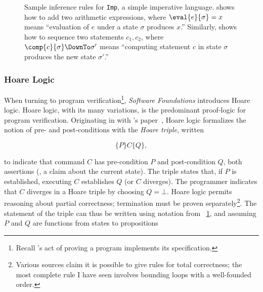 \begin{figure}
    \centering
    \caption{Sample inference rules for \texttt{Imp}, a simple imperative
    language.  shows how to add two arithmetic expressions, where
    \(\eval{e}{\sigma} = x\) means ``evaluation of \(e\) under a state
    \(\sigma\) produces \(x\).'' Similarly,  shows how to sequence
    two statements \(c_1, c_2\), where \(\comp{c}{\sigma} \DownTo \sigma'\)
    means ``computing statement \(c\) in state \(\sigma\) produces the new state
    \(\sigma'\).''}\label{F:Imp_ex}
\end{figure}

\subsubsection{Hoare Logic}

When turning to program verification\footnote{Recall \citeauthor{EWD:EWD1036}'s
act of proving a program implements its specification.}, \emph{Software
Foundations} introduces Hoare logic. Hoare logic, with its many variations, is
the predominant proof-logic for program verification. Originating in
\citeyear{Hoare_1969} with \citeauthor{Hoare_1969}'s paper~\cite{Hoare_1969},
Hoare logic formalizes the notion of pre- and post-conditions with the
\emph{Hoare triple}, written

\begin{equation*}
    \{P\} C \{Q\},
\end{equation*}

to indicate that command \(C\) has pre-condition \(P\) and post-condition \(Q\),
both assertions (\eg, a claim about the current state). The triple states that,
if \(P\) is established, executing \(C\) establishes \(Q\) (or \(C\) diverges).
The programmer indicates that \(C\) diverges in a Hoare triple by choosing \(Q =
\bot\). Hoare logic permits reasoning about partial correctness; termination
must be proven separately\footnote{Various sources claim it is possible to give
rules for total correctness; the most complete rule I have seen involves
bounding loops with a well-founded order.}. The statement of the triple can thus
be written using notation from \figurename~\ref{F:Imp_ex}, and assuming \(P\)
and \(Q\) are functions from states to propositions

